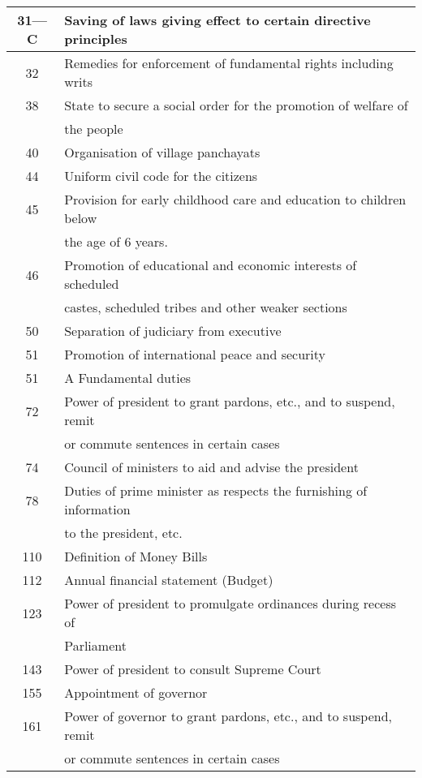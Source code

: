\begin{longtable}[c]{@{}|c|l|@{}}
  31—C & Saving of laws giving effect to certain directive principles \\ \midrule
  32 & Remedies for enforcement of fundamental rights including writs \\ \midrule
  38 & State to secure a social order for the promotion of welfare of \\
     & the people \\ \midrule
  40 & Organisation of village panchayats \\ \midrule
  44 & Uniform civil code for the citizens \\ \midrule
  45 & Provision for early childhood care and education to children below \\
     & the age of 6 years. \\ \midrule
  46 & Promotion of educational and economic interests of scheduled \\
     & castes, scheduled tribes and other weaker sections \\ \midrule
  50 & Separation of judiciary from executive \\ \midrule
  51 & Promotion of international peace and security \\ \midrule
  51 & A Fundamental duties \\ \midrule
  72 & Power of president to grant pardons, etc., and to suspend, remit\\ \midrule
     & or commute sentences in certain cases \\ \midrule
  74 & Council of ministers to aid and advise the president \\
  78 & Duties of prime minister as respects the furnishing of information \\
     & to the president, etc. \\ \midrule
  110 & Definition of Money Bills \\ \midrule
  112 & Annual financial statement (Budget) \\ \midrule
  123 & Power of president to promulgate ordinances during recess of\\
      & Parliament \\ \midrule
  143 & Power of president to consult Supreme Court \\ \midrule
  155 & Appointment of governor \\ \midrule
  161 & Power of governor to grant pardons, etc., and to suspend, remit\\
      & or commute sentences in certain cases \\ \midrule

\end{longtable}
